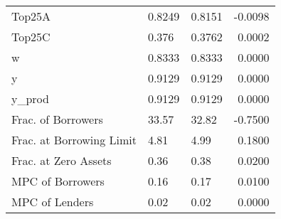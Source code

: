 \begin{table}
\begin{tabular}{lllr}
                  Top25A &  0.8249 &   0.8151 & -0.0098 \\
                  Top25C &   0.376 &   0.3762 &  0.0002 \\
                       w &  0.8333 &   0.8333 &  0.0000 \\
                       y &  0.9129 &   0.9129 &  0.0000 \\
                  y\_prod &  0.9129 &   0.9129 &  0.0000 \\
      Frac. of Borrowers &   33.57 &    32.82 & -0.7500 \\
Frac. at Borrowing Limit &    4.81 &     4.99 &  0.1800 \\
    Frac. at Zero Assets &    0.36 &     0.38 &  0.0200 \\
        MPC of Borrowers &    0.16 &     0.17 &  0.0100 \\
          MPC of Lenders &    0.02 &     0.02 &  0.0000 \\
\bottomrule
\end{tabular}
\end{table}
